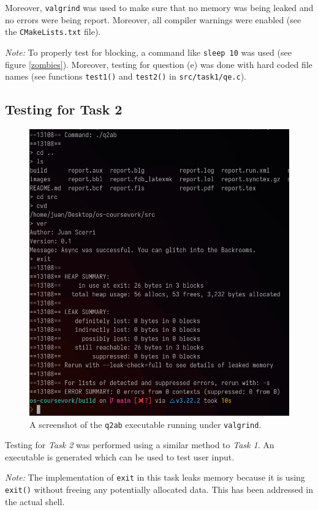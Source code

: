 \documentclass[12pt]{article}
\begin{document}
Moreover, \texttt{valgrind} was used to make sure that no memory
was being leaked and no errors were being report. Moreover, all
compiler warnings were enabled (see the \texttt{CMakeLists.txt}
file).

\textit{Note:} To properly test for blocking, a command like
\texttt{sleep 10} was used (see figure \ref{zombies}). Moreover,
testing for question (e) was done with hard coded file names
(see functions \texttt{test1()} and \texttt{test2()}
in \texttt{src/task1/qe.c}).

\subsection{Testing for Task 2}

\begin{figure}[H]
\centering
\includegraphics[width=12cm]{q2ab-test}
\caption{A screenshot of the \texttt{q2ab} executable running
under \texttt{valgrind}.}
\end{figure}

Testing for \textit{Task 2} was performed using a similar method
to \textit{Task 1}. An executable is generated which can be used
to test user input.

\textit{Note:} The implementation of \texttt{exit} in this task
leaks memory because it is using \texttt{exit()} without freeing
any potentially allocated data. This has been addressed in the
actual shell.
\end{document}
